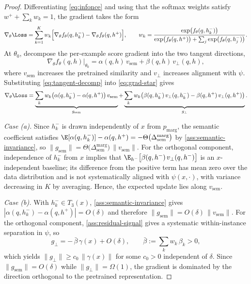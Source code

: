 \begin{proof}
Differentiating \eqref{eq:infonce} and using that the softmax weights satisfy $w^+ + \sum_k w_k = 1$, the gradient takes the form
\begin{equation}
  \nabla_\theta \Loss = \sum_{k=1}^{K} w_k \Big[ \nabla_\theta f_\theta(q, h_k^-) - \nabla_\theta f_\theta(q, h^+) \Big], \qquad w_k = \frac{\exp\!\big(f_\theta(q, h_k^-)\big)} {\exp\!\big(f_\theta(q, h^+)\big) + \sum_j \exp\!\big(f_\theta(q, h_j^-)\big)} .
  \label{eq:grad-star}
\end{equation}
At $\theta_0$, decompose the per-example score gradient into the two tangent directions,
\begin{equation}
  \nabla_\theta f_\theta(q,h)\big|_{\theta_0} = \alpha(q,h)\, v_{\mathrm{sem}} + \beta(q,h)\, v_\perp(q,h),
  \label{eq:tangent-decomp}
\end{equation}
where $v_{\mathrm{sem}}$ increases the pretrained similarity and $v_\perp$ increases alignment with $\psi$. Substituting
\eqref{eq:tangent-decomp} into \eqref{eq:grad-star} gives
\begin{equation}
  \nabla_\theta \Loss = \underbrace{\sum_k w_k \big(\alpha(q,h_k^-) - \alpha(q,h^+)\big)\, v_{\mathrm{sem}}}_{g_{\mathrm{sem}}} + \underbrace{\sum_k w_k \big(\beta(q,h_k^-)\, v_\perp(q,h_k^-) - \beta(q,h^+)\, v_\perp(q,h^+)\big)}_{g_\perp}.
\end{equation}

\emph{Case (a).} Since $h_k^-$ is drawn independently of $x$ from $p_{\mathrm{marg}}$, the semantic coefficient satisfies $\E[\alpha(q,h_k^-)] - \alpha(q,h^+) = -\Theta\big(\Delta_{\mathrm{sem}}^{\mathrm{marg}}\big)$ by \cref{ass:semantic-invariance}, so $\|g_{\mathrm{sem}}\| = \Theta\big(\Delta_{\mathrm{sem}}^{\mathrm{marg}}\big)\,\|v_{\mathrm{sem}}\|$. For the orthogonal component, independence of $h_k^-$ from $x$ implies that $\E_{h^-}\big[\beta(q,h^-)\, v_\perp(q,h^-)\big]$ is an $x$-independent baseline; its difference from the positive term has mean zero over the data distribution and is not systematically aligned with $\psi(x,\cdot)$, with variance decreasing in $K$ by averaging. Hence, the expected update lies along $v_{\mathrm{sem}}$.

\emph{Case (b).} With $h_k^- \in T_3(x)$, \cref{ass:semantic-invariance} gives $|\alpha(q,h_k^-) - \alpha(q,h^+)| = O(\delta)$ and therefore $\|g_{\mathrm{sem}}\| = O(\delta)\,\|v_{\mathrm{sem}}\|$. For the orthogonal component, \cref{ass:residual-signal} gives a systematic within-instance separation in $\psi$, so
\begin{equation}
  g_\perp = -\,\bar{\beta}\,\gamma(x) + O(\delta), \qquad \bar{\beta} := \textstyle\sum_k w_k\, \beta_k > 0 ,
\end{equation}
which yields $\|g_\perp\| \geq c_0\, \|\gamma(x)\|$ for some $c_0 > 0$ independent of $\delta$. Since $\|g_{\mathrm{sem}}\| = O(\delta)$ while $\|g_\perp\| = \Omega(1)$, the gradient is dominated by the direction orthogonal to the pretrained representation.
\end{proof}

